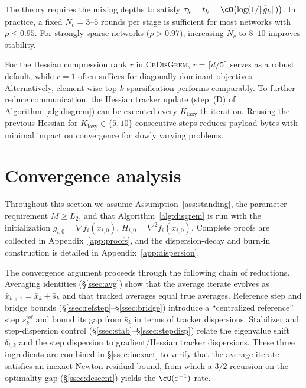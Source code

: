 \documentclass[review,onefignum,onetabnum]{siamart171218}
\begin{document}
	The theory requires the mixing depths to satisfy
	$\tau_k = t_k = \cO\bigl(\log(1/\|\tilde{\bar g}_k\|)\bigr)$.
	In practice, a fixed $N_c = 3$--$5$ rounds per stage is sufficient
	for most networks with $\rho \le 0.95$.
	For strongly sparse networks ($\rho > 0.97$), increasing $N_c$ to
	$8$--$10$ improves stability.
	
	For the Hessian compression rank $r$ in \textsc{CeDisGrem},
	$r = \lceil d/5 \rceil$ serves as a robust default, while $r=1$
	often suffices for diagonally dominant objectives.
	Alternatively, element-wise top-$k$ sparsification performs comparably.
	To further reduce communication, the Hessian tracker update
	(step~(D) of Algorithm~\ref{alg:disgrem}) can be executed every
	$K_{\mathrm{lazy}}$-th iteration.
	Reusing the previous Hessian for
	$K_{\mathrm{lazy}}\in\{5,10\}$ consecutive steps reduces
	payload bytes with minimal impact on convergence for slowly varying
	problems.
	
	
	\section{Convergence analysis}\label{sec:theory}
	Throughout this section we assume Assumption~\ref{ass:standing},
	the parameter requirement $M\ge L_2$, and that
	Algorithm~\ref{alg:disgrem} is run with the initialization
	$g_{i,0}=\nabla f_i(x_{i,0})$, $H_{i,0}=\nabla^2 f_i(x_{i,0})$.
	Complete proofs are collected in Appendix~\ref{app:proofs}, and the
	dispersion-decay and burn-in construction is detailed in
	Appendix~\ref{app:dispersion}.
	
	The convergence argument proceeds through the following chain of
	reductions.
	Averaging identities (\S\ref{ssec:avg}) show that the average iterate evolves as
	$\bar x_{k+1}=\bar x_k+\bar s_k$ and that tracked averages
	equal true averages.
	Reference step and bridge bounds
	(\S\ref{ssec:refstep}--\S\ref{ssec:bridge}) introduce a
	``centralized reference'' step $s_k^{\mathrm{ref}}$ and bound
	its gap from $\bar s_k$ in terms of tracker dispersions.
	Stabilizer and step-dispersion control
	(\S\ref{ssec:stab}--\S\ref{ssec:stepdisp}) relate the
	eigenvalue shift $\delta_{i,k}$ and the step dispersion to
	gradient/Hessian tracker dispersions.
	These three ingredients are combined in \S\ref{ssec:inexact}
	to verify that the
	average iterate satisfies an inexact Newton residual bound,
	from which a $3/2$-recursion on the
	optimality gap (\S\ref{ssec:descent}) yields the $\cO(\varepsilon^{-1})$ rate.
	
\end{document}
